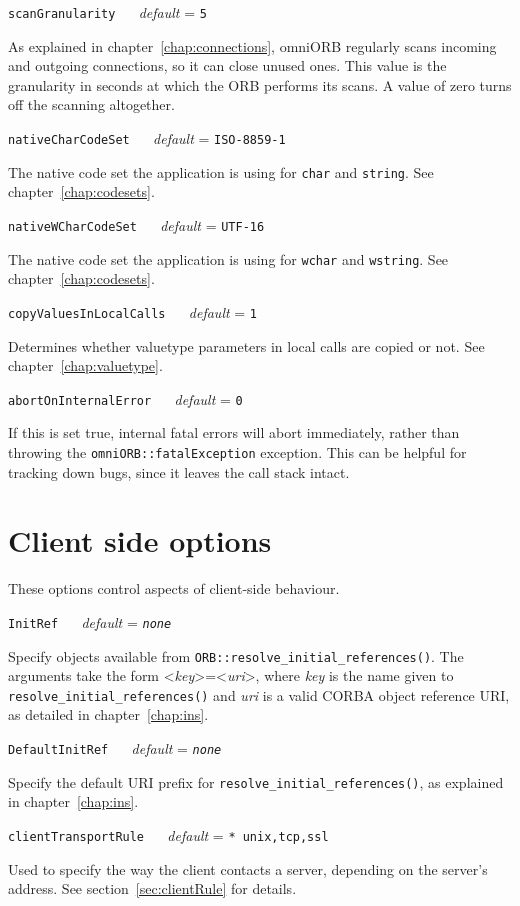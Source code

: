 \documentclass[11pt,twoside,a4paper]{book}
\makeatletter
\newcommand{\type}[1]{\texttt{#1}}
\newcommand{\code}[1]{\texttt{#1}}
\newcommand{\op}[1]{\texttt{#1()}}
\newcommand{\confopt}[2]
  {\vspace{\baselineskip}\par\noindent\code{#1} ~~ \textit{default} =
   \code{#2}}
\renewcommand{\confopt}[2]
  {\vspace{\baselineskip}\par\noindent\code{#1} ~~ \textit{default} =
   \code{#2}\\[-1ex]\@afterheading}
\newcommand{\dsc}{\discretionary{}{}{}}
\makeatother
\begin{document}
\confopt{scanGranularity}{5}

As explained in chapter~\ref{chap:connections}, omniORB regularly
scans incoming and outgoing connections, so it can close unused
ones. This value is the granularity in seconds at which the ORB
performs its scans. A value of zero turns off the scanning altogether.


\confopt{nativeCharCodeSet}{ISO-8859-1}

The native code set the application is using for \type{char} and
\type{string}. See chapter~\ref{chap:codesets}.


\confopt{nativeWCharCodeSet}{UTF-16}

The native code set the application is using for \type{wchar} and
\type{wstring}. See chapter~\ref{chap:codesets}.


\confopt{copyValuesInLocalCalls}{1}

Determines whether valuetype parameters in local calls are copied or
not. See chapter~\ref{chap:valuetype}.


\confopt{abortOnInternalError}{0}

If this is set true, internal fatal errors will abort immediately,
rather than throwing the \type{omniORB::fatalException} exception.
This can be helpful for tracking down bugs, since it leaves the call
stack intact.


\section{Client side options}

These options control aspects of client-side behaviour.


\confopt{InitRef}{\textit{none}}

Specify objects available from
\op{ORB::resolve\_initial\_references}. The arguments take the form
<\textit{key}>=<\textit{uri}>, where \textit{key} is the name given to
\op{resolve\_\dsc{}initial\_\dsc{}references} and \textit{uri} is a
valid CORBA object reference URI, as detailed in
chapter~\ref{chap:ins}.


\confopt{DefaultInitRef}{\textit{none}}

Specify the default URI prefix for
\op{resolve\_\dsc{}initial\_\dsc{}references}, as explained in
chapter~\ref{chap:ins}.


\confopt{clientTransportRule}{* unix,tcp,ssl}

Used to specify the way the client contacts a server, depending on the
server's address. See section~\ref{sec:clientRule} for details.
\end{document}
